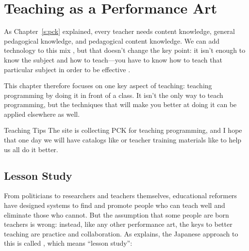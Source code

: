 \chapter{Teaching as a Performance Art}\label{s:performance}

As Chapter~\ref{s:pck} explained,
every teacher needs content knowledge,
general pedagogical knowledge,
and pedagogical content knowledge.
We can add technology to this mix \cite{Koeh2013},
but that doesn't change the key point:
it isn't enough to know the subject and how to teach---you have to know
how to teach that particular subject in order to be effective \cite{Maye2004}.

This chapter therefore focuses on one key aspect of teaching:
teaching programming by doing it in front of a class.
It isn't the only way to teach programming,
but the techniques that will make you better at doing it
can be applied elsewhere as well.

\begin{aside}{Teaching Tips}
  The  site
  is collecting PCK for teaching programming,
  and I hope that one day we will have catalogs like \cite{Ojos2015}
  or teacher training materials like \cite{Hazz2014,Guzd2015a,Sent2018}
  to help us all do it better.
\end{aside}

\section{Lesson Study}\label{s:performance-jugyokenkyu}

From politicians to researchers and teachers themselves,
educational reformers have designed systems
to find and promote people who can teach well
and eliminate those who cannot.
But the assumption that some people are born teachers is wrong:
instead,
like any other performance art,
the keys to better teaching are practice and collaboration.
As \cite{Gree2014} explains,
the Japanese approach to this is called ,
which means ``lesson study'':

